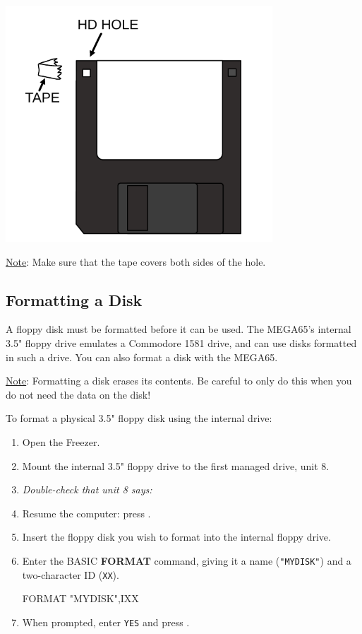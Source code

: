\begin{center}
  \includegraphics[width=0.75\textwidth]{images/illustrations/floppy_hd.pdf}
\end{center}

\underline{Note}: Make sure that the tape covers both sides of the hole.

\subsection{Formatting a Disk}

A floppy disk must be formatted before it can be used. The MEGA65's internal 3.5" floppy drive emulates a Commodore 1581 drive, and can use disks formatted in such a drive. You can also format a disk with the MEGA65.

\underline{Note}: Formatting a disk erases its contents. Be careful to only do this when you do not need the data on the disk!

To format a physical 3.5" floppy disk using the internal drive:

\begin{enumerate}
\item Open the Freezer.
\item Mount the internal 3.5" floppy drive to the first managed drive, unit 8.
\item {\it Double-check that unit 8 says:} 
\item Resume the computer: press .
\item Insert the floppy disk you wish to format into the internal floppy drive.
\item Enter the BASIC {\bf FORMAT} command, giving it a name ({\tt "MYDISK"}) and a two-character ID ({\tt XX}).
\begin{screenoutput}
FORMAT "MYDISK",IXX
\end{screenoutput}
\item When prompted, enter {\tt YES} and press .
\end{enumerate}

